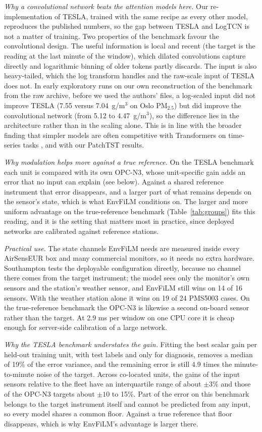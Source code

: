 \documentclass[journal]{IEEEtran}
\newcommand{\PMtwo}{PM$_{2.5}$}
\newcommand{\ugm}{\textmu g/m$^3$}
\begin{document}
\textit{Why a convolutional network beats the attention models here.} Our re-implementation of TESLA, trained with the
same recipe as every other model, reproduces the published numbers, so the gap between TESLA and LogTCN is not a
matter of training. Two properties of the benchmark favour the convolutional design. The useful information is local
and recent (the target is the reading at the last minute of the window), which dilated convolutions capture directly
and logarithmic binning of older tokens partly discards. The input is also heavy-tailed, which the log transform
handles and the raw-scale input of TESLA does not. In early exploratory runs on our own reconstruction of the benchmark
from the raw archive, before we used the authors' files, a log-scaled input did not improve TESLA (7.55 versus 7.04~\ugm{} on
Oslo \PMtwo) but did improve the convolutional network (from 5.12 to 4.47~\ugm{}), so the difference lies in the architecture
rather than in the scaling alone. This is in line with the broader finding that simpler models are often competitive
with Transformers on time-series tasks \cite{zeng2023}, and with our PatchTST results.

\textit{Why modulation helps more against a true reference.} On the TESLA benchmark each unit is compared with its own
OPC-N3, whose unit-specific gain adds an error that no input can explain (see below). Against a shared
reference instrument that error disappears, and a larger part of what remains depends on the sensor's state, which is
what EnvFiLM conditions on. The larger and more uniform advantage on the true-reference benchmark
(Table~\ref{tab:groups}) fits this reading, and it is the setting that matters most in practice, since deployed
networks are calibrated against reference stations.

\textit{Practical use.} The state channels EnvFiLM needs are measured inside every AirSensEUR box and many commercial
monitors, so it needs no extra hardware. Southampton tests the deployable configuration directly, because no channel
there comes from the target instrument; the model sees only the monitor's own sensors and the station's weather sensor,
and EnvFiLM still wins on 14 of 16 sensors. With the weather station alone it wins on 19 of 24 PMS5003 cases. On the
true-reference benchmark the OPC-N3 is likewise a second on-board sensor rather than the target. At 2.9 ms
per window on one CPU core it is cheap enough for server-side calibration of a large network.

\textit{Why the TESLA benchmark understates the gain.} Fitting the best scalar gain per held-out training unit, with
test labels and only for diagnosis, removes a median of 19\% of the error variance, and the remaining error is still
4.9 times the minute-to-minute noise of the target. Across co-located units, the gains of the input sensors relative to
the fleet have an interquartile range of about $\pm3\%$ and those of the OPC-N3 targets about $\pm10$ to 15\%. Part of
the error on this benchmark belongs to the target instrument itself and cannot be predicted from any input, so every
model shares a common floor. Against a true reference that floor disappears, which is why EnvFiLM's advantage is
larger there.
\end{document}
